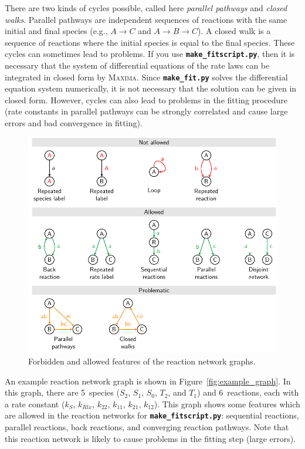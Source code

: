 \documentclass[a4paper,10pt,DIV=15,openany]{scrbook}
\newcommand{\ttt}[1]{\textbf{\texttt{#1}}}
\begin{document}
There are two kinds of cycles possible, called here \textit{parallel pathways} and \textit{closed walks}.
Parallel pathways are independent sequences of reactions with the same initial and final species (e.g., $A\rightarrow C$ and $A\rightarrow B\rightarrow C$).
A closed walk is a sequence of reactions where the initial species is equal to the final species.
These cycles can sometimes lead to problems.
If you use \ttt{make\_fitscript.py}, then it is necessary that the system of differential equations of the rate laws can be integrated in closed form by \textsc{Maxima}.
Since \ttt{make\_fit.py} solves the differential equation system numerically, it is not necessary that the solution can be given in closed form.
However, cycles can also lead to problems in the fitting procedure (rate constants in parallel pathways can be strongly correlated and cause large errors and bad convergence in fitting).

\begin{figure}[htb]
  \centering
  \includegraphics[scale=1]{img/reaction_networks/allowed_notallowed.pdf}
  \caption{Forbidden and allowed features of the reaction network graphs.}
  \label{fig:graph_restrictions}
\end{figure}

An example reaction network graph is shown in Figure~\ref{fig:example_graph}.
In this graph, there are 5~species ($S_2$, $S_1$, $S_0$, $T_2$, and $T_1$) and 6~reactions, each with a rate constant ($k_S$, $k_{Rlx}$, $k_{22}$, $k_{11}$, $k_{21}$, $k_{12}$).
This graph shows some features which are allowed in the reaction networks for \ttt{make\_fitscript.py}: sequential reactions, parallel reactions, back reactions, and converging reaction pathways.
Note that this reaction network is likely to cause problems in the fitting step (large errors).
\end{document}
